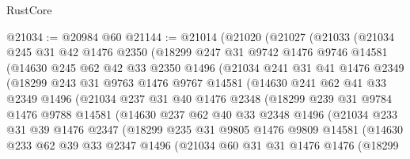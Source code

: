 \begin{lexlean}{RustCore}
\begin{coremodule}
@21034 := @20984 @60
@21144 := @21014
    (@21020
      (@21027
        (@21033
          (@21034
            @245
            @31
            @42
            @1476
            @2350
            (@18299
              @247
              @31
              @9742
              @1476
              @9746
              @14581
              (@14630
                @245
                @62
                @42
                @33
                @2350
                @1496
                (@21034
                  @241
                  @31
                  @41
                  @1476
                  @2349
                  (@18299
                    @243
                    @31
                    @9763
                    @1476
                    @9767
                    @14581
                    (@14630
                      @241
                      @62
                      @41
                      @33
                      @2349
                      @1496
                      (@21034
                        @237
                        @31
                        @40
                        @1476
                        @2348
                        (@18299
                          @239
                          @31
                          @9784
                          @1476
                          @9788
                          @14581
                          (@14630
                            @237
                            @62
                            @40
                            @33
                            @2348
                            @1496
                            (@21034
                              @233
                              @31
                              @39
                              @1476
                              @2347
                              (@18299
                                @235
                                @31
                                @9805
                                @1476
                                @9809
                                @14581
                                (@14630
                                  @233
                                  @62
                                  @39
                                  @33
                                  @2347
                                  @1496
                                  (@21034
                                    @60
                                    @31
                                    @31
                                    @1476
                                    @1476
                                    (@18299

\end{coremodule}
\end{lexlean}
